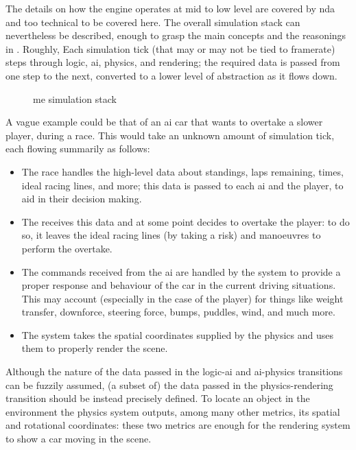 The details on how the engine operates at mid to low level are covered by \gls{nda} and too technical to be covered here. The overall simulation stack can nevertheless be described, enough to grasp the main concepts and the reasonings in . Roughly, Each simulation tick (that may or may not be tied to framerate) steps through logic, \gls{ai}, physics, and rendering; the required data is passed from one step to the next, converted to a lower level of abstraction as it flows down.

\begin{figure}[!ht]
	\FLOATcenter{}

    \caption{\gls{me} simulation stack}\label{im:software:mestack}
\end{figure}

A vague example could be that of an \gls{ai} car that wants to overtake a slower player, during a race. This would take an unknown amount of simulation tick, each flowing summarily as follows:

\begin{itemize}
	\item The race  handles the high-level data about standings, laps remaining, times, ideal racing lines, and more; this data is passed to each \gls{ai} and the player, to aid in their decision making.
	\item The  receives this data and at some point decides to overtake the player: to do so, it leaves the ideal racing lines (by taking a risk) and manoeuvres to perform the overtake.
	\item The commands received from the \gls{ai} are handled by the  system to provide a proper response and behaviour of the car in the current driving situations. This may account (especially in the case of the player) for things like weight transfer, downforce, steering force, bumps, puddles, wind, and much more.
	\item The  system takes the spatial coordinates supplied by the physics and uses them to properly render the scene.
\end{itemize}

Although the nature of the data passed in the logic-\gls{ai} and \gls{ai}-physics transitions can be fuzzily assumed, (a subset of) the data passed in the physics-rendering transition should be instead precisely defined. To locate an object in the environment the physics system outputs, among many other metrics, its spatial and rotational coordinates: these two metrics are enough for the rendering system to show a car moving in the scene.

